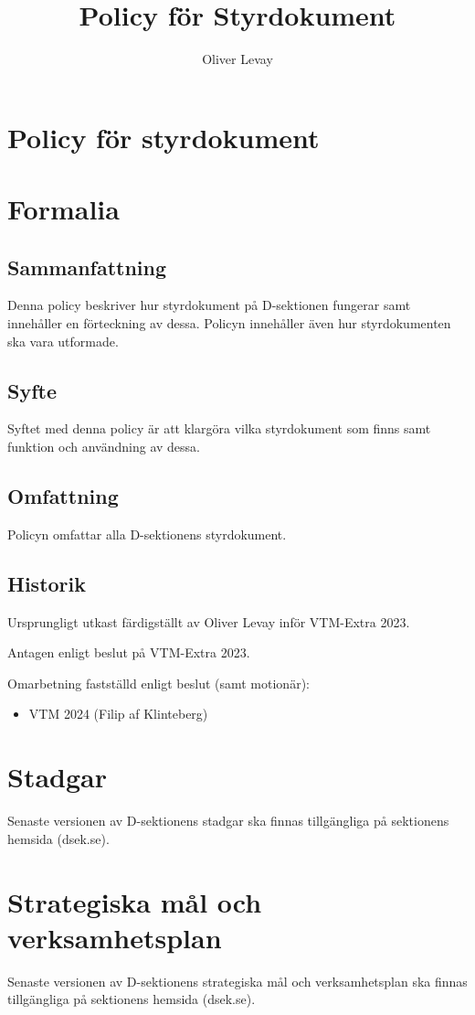 \documentclass[]{dsekprotokoll}
\title{Policy för Styrdokument}
\author{Oliver Levay}
\begin{document}
\section*{Policy för styrdokument}
\section{Formalia}
\subsection{Sammanfattning}
Denna policy beskriver hur styrdokument på D-sektionen fungerar samt innehåller en förteckning av dessa. Policyn innehåller även hur styrdokumenten ska vara utformade.
\subsection{Syfte}
Syftet med denna policy är att klargöra vilka styrdokument som finns samt funktion och användning av dessa.
\subsection{Omfattning}
Policyn omfattar alla D-sektionens styrdokument.

\subsection{Historik}
Ursprungligt utkast färdigställt av Oliver Levay inför VTM-Extra 2023.

Antagen enligt beslut på VTM-Extra 2023.

Omarbetning fastställd enligt beslut (samt motionär):
\begin{itemize}
    \item VTM 2024 (Filip af Klinteberg)
\end{itemize}
\section{Stadgar}
Senaste versionen av D-sektionens stadgar ska finnas tillgängliga på sektionens hemsida (dsek.se).

\section{Strategiska mål och verksamhetsplan}
Senaste versionen av D-sektionens strategiska mål och verksamhetsplan ska finnas tillgängliga på sektionens hemsida (dsek.se).
\end{document}
